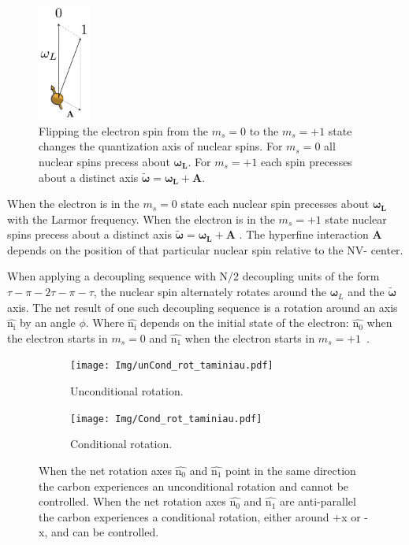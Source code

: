 \begin{figure}[htbp]
\centering
\includegraphics[keepaspectratio,width=0.15\textwidth]{./img/QuantizationAxis.png}
\caption{Flipping the electron spin from the  $m_s=0$ to the $m_s= +1$ state changes the quantization axis of nuclear spins. For  $m_s=0$ all nuclear spins precess about $\bm{\omega_L}$. For  $m_s=+1$ each spin precesses about a distinct axis $\bm{\tilde{\omega}}=\bm{\omega_L} +\bm{A}$.}
\label{fig:quantax}
\end{figure}

When the electron is in the $m_s=0$ state each nuclear spin precesses about $\bm{\omega_L}$ with the Larmor frequency. When the electron is in the $m_s=+1$ state nuclear spins precess about a distinct axis $\bm{\tilde{\omega}}=\bm{\omega_L} +\bm{A}$ \citep{Taminiau2012Detection}. The hyperfine interaction $\bm{A}$ depends on the position of that particular nuclear spin relative to the NV- center.

When applying a decoupling sequence with N\slash 2 decoupling units of the form {$\tau - \pi -2\tau-\pi-\tau$}, the nuclear spin alternately rotates around the  $\bm\omega_L$ and the $\bm{\tilde{\omega}}$ axis.
The net result of one such decoupling sequence is a rotation around an axis $\bm{\hat{\mathrm{n_i}}}$ by an angle $\phi$.
Where $\bm{\hat{\mathrm{n_i}}}$ depends on the initial state of the electron: $\bm{\hat{\mathrm{n_0}}}$ when the electron starts in $m_s = 0$ and $\bm{\hat{\mathrm{n_1}}}$ when the electron starts in $m_s = +1$~\citep{Taminiau2012Detection}.

\begin{figure}[htbp]
    \begin{subfigure}[t]{0.49\textwidth}\centering
        \centering
        \texttt{[image: Img/unCond\_rot\_taminiau.pdf]}
        \caption{Unconditional rotation.}
        \label{fig:uncond_rot}
    \end{subfigure}
    \begin{subfigure}[t]{0.49\textwidth}\centering
        \centering
        \texttt{[image: Img/Cond\_rot\_taminiau.pdf]}
        \caption{Conditional rotation.}
        \label{fig:cond_rot}
    \end{subfigure}
    \caption{ When the net rotation axes $\bm{\hat{\mathrm{n_0}}}$ and $\bm{\hat{\mathrm{n_1}}}$ point in the same direction the carbon experiences an unconditional rotation and cannot be controlled.  When the net rotation axes $\bm{\hat{\mathrm{n_0}}}$ and $\bm{\hat{\mathrm{n_1}}}$ are anti-parallel the carbon experiences a conditional rotation, either around +x or -x, and can be controlled.}
    \label{fig:conditional_and_unconditional_rotation}
\end{figure}


